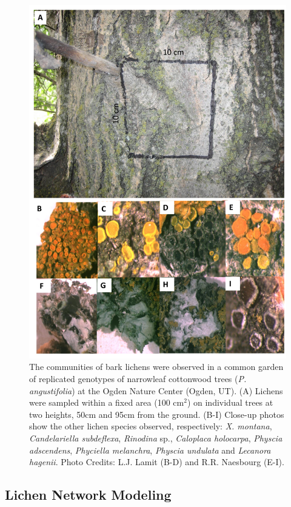 \documentclass[fleqn,12pt]{olplainarticle}
\begin{document}
\begin{figure}[ht]
\includegraphics[width=0.90\linewidth]{figures/lcn_sampling.png}
\caption{The communities of bark lichens were observed in a common
  garden of replicated genotypes of narrowleaf cottonwood trees
  (\textit{P. angustifolia}) at the Ogden Nature Center (Ogden,
  UT). (A) Lichens were sampled within a fixed area (100 cm$^2$) on
  individual trees at two heights, 50cm and 95cm from the
  ground. (B-I) Close-up photos show the other lichen species
  observed, respectively:  \textit{X. montana}, \textit{Candelariella
    subdeflexa}, \textit{Rinodina} sp., \textit{Caloplaca holocarpa},
  \textit{Physcia adscendens}, \textit{Phyciella melanchra},
  \textit{Physcia undulata} and \textit{Lecanora hagenii}. Photo
  Credits: L.J. Lamit (B-D) and R.R. Naesbourg (E-I).}
\label{fig:lichen_sampling}
\end{figure}


\subsection*{Lichen Network Modeling}
\end{document}
